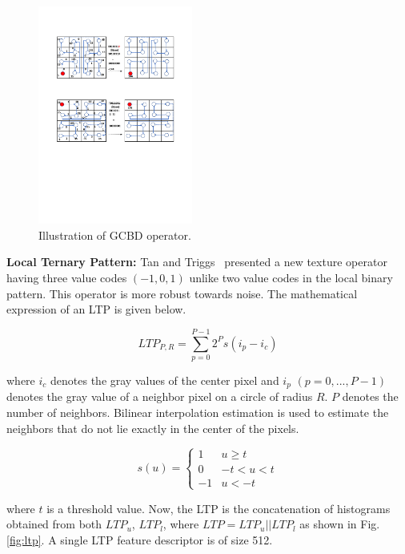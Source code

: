 \begin{figure}[!ht]
	\centering
	\includegraphics[width=2.0in]{images/gcbd.pdf}
	\caption{Illustration of GCBD operator.}
	\label{GCBD1}
\end{figure}

\noindent \textbf{Local Ternary Pattern:} Tan and Triggs~\cite{tan2010enhanced}
presented a new texture operator having three value codes $(-1,0,1)$ unlike two
value codes in the local binary pattern. This operator is more robust towards noise.
The mathematical expression of an LTP is given below.

\begin{equation}
	LTP_{P,R}=\sum_{p=0}^{P-1}2^{P}s(i_{p}-i_{c})
\end{equation}

where $i_{c}$ denotes the gray values of the center
pixel and $i_{p}$ $(p = 0,..., P-1)$ denotes the gray value of a neighbor pixel
on a circle of radius $R$. $P$ denotes the number of neighbors. Bilinear
interpolation estimation is used to estimate the neighbors that do not lie exactly in the center
of the pixels.

\begin{equation}
	s(u)=\left\{\begin{matrix}
		1  & u \geq t   \\
		0  & -t < u < t \\
		-1 & u < -t
	\end{matrix}\right.
\end{equation}

where $t$ is a threshold value. Now, the LTP is the concatenation of histograms
obtained from both $LTP_{u}$, $LTP_{l}$, where $LTP=LTP_{u} || LTP_{l}$ as shown
in Fig. \ref{fig:ltp}. A single LTP feature descriptor is of size 512.\\

